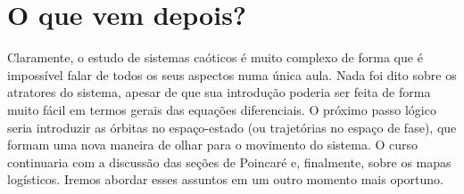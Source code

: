 \documentclass{article}
\begin{document}
\section{O que vem depois?}

Claramente, o estudo de sistemas caóticos é muito complexo de forma que é impossível falar de todos os seus aspectos numa única aula. Nada foi dito sobre os atratores do sistema, apesar de que sua introdução poderia ser feita de forma muito fácil em termos gerais das equações diferenciais. O próximo passo lógico seria introduzir as órbitas no espaço-estado (ou trajetórias no espaço de fase), que formam uma nova maneira de olhar para o movimento do sistema. O curso continuaria com a discussão das seções de Poincaré e, finalmente, sobre os mapas logísticos. Iremos abordar esses assuntos em um outro momento mais oportuno.
\end{document}

